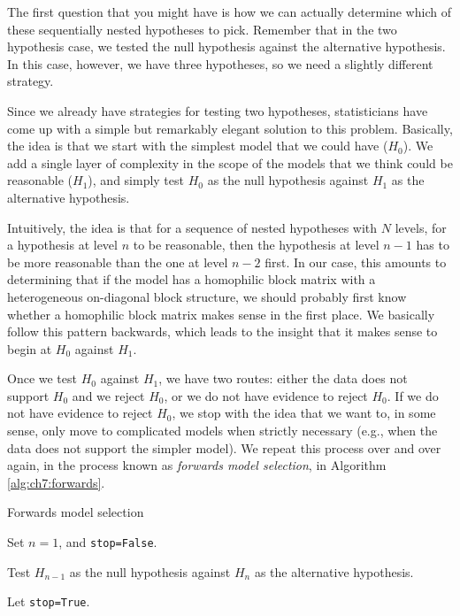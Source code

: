 The first question that you might have is how we can actually determine which of these sequentially nested hypotheses to pick. Remember that in the two hypothesis case, we tested the null hypothesis against the alternative hypothesis. In this case, however, we have three hypotheses, so we need a slightly different strategy. 

Since we already have strategies for testing two hypotheses, statisticians have come up with a simple but remarkably elegant solution to this problem. Basically, the idea is that we start with the simplest model that we could have ($H_0$). We add a single layer of complexity in the scope of the models that we think could be reasonable ($H_1$), and simply test $H_0$ as the null hypothesis against $H_1$ as the alternative hypothesis. 

Intuitively, the idea is that for a sequence of nested hypotheses with $N$ levels, for a hypothesis at level $n$ to be reasonable, then the hypothesis at level $n-1$ has to be more reasonable than the one at level $n-2$ first. In our case, this amounts to determining that if the model has a homophilic block matrix with a heterogeneous on-diagonal block structure, we should probably first know whether a homophilic block matrix makes sense in the first place. We basically follow this pattern backwards, which leads to the insight that it makes sense to begin at $H_0$ against $H_1$.

Once we test $H_0$ against $H_1$, we have two routes: either the data does not support $H_0$ and we reject $H_0$, or we do not have evidence to reject $H_0$. If we do not have evidence to reject $H_0$, we stop with the idea that we want to, in some sense, only move to complicated models when strictly necessary (e.g., when the data does not support the simpler model). We repeat this process over and over again, in the process known as \textit{forwards model selection}, in Algorithm \ref{alg:ch7:forwards}.

\begin{algorithm}[h]\caption{Forwards model selection}
\label{alg:ch7:forwards}
\SetAlgoLined

Set $n = 1$, and \texttt{stop=False}.

 {
    
    Test $H_{n-1}$ as the null hypothesis against $H_n$ as the alternative hypothesis. 
    
     {
        Let \texttt{stop=True}.
    } 
}

\end{algorithm}

